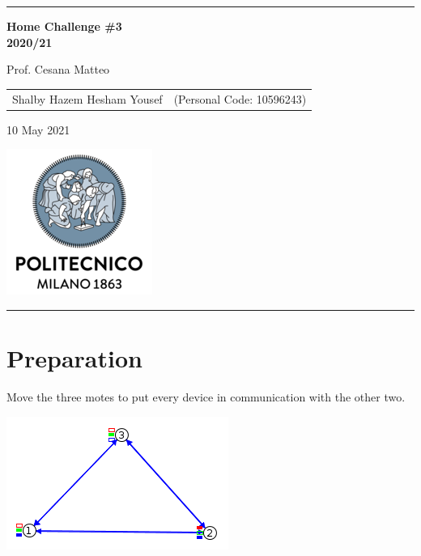 \documentclass{article}
\begin{document}
\setlength\parindent{0pt} %
\setlength\parskip{1em}

\begin{titlepage}
	\centering
	\hrule
	
	\vspace{6,5cm}
	{\Huge \textbf{Home Challenge \#3\\
		2020/21}\\}
		
		\vspace{0,5cm}
		\large {Prof. Cesana Matteo}
		
		\vspace{2,5cm}
		{
			\large
			\begin{tabular}{c c}
				Shalby Hazem Hesham Yousef & (Personal Code: 10596243) \\
			\end{tabular}
			
		}
		\vspace{4cm}
		
		\normalsize{10 May 2021}
		\vspace{0,2cm}
		
		\centering\hspace{0,2cm}\includegraphics[scale=0.6]{./logo.png}
		\vspace{0,5cm}
		\hrule
		
		\end{titlepage}
		
		\pagebreak
		
		\pagebreak
		
		\section{Preparation} %
        Move the three motes to put every device in communication with the other two. 
        \begin{center}
        \includegraphics{./mote_screen.png}            
        \end{center}
\end{document}

